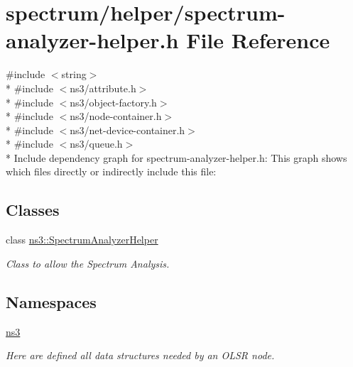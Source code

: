 \hypertarget{spectrum-analyzer-helper_8h}{}\section{spectrum/helper/spectrum-\/analyzer-\/helper.h File Reference}
\label{spectrum-analyzer-helper_8h}
{\ttfamily \#include $<$string$>$}\\*
{\ttfamily \#include $<$ns3/attribute.\+h$>$}\\*
{\ttfamily \#include $<$ns3/object-\/factory.\+h$>$}\\*
{\ttfamily \#include $<$ns3/node-\/container.\+h$>$}\\*
{\ttfamily \#include $<$ns3/net-\/device-\/container.\+h$>$}\\*
{\ttfamily \#include $<$ns3/queue.\+h$>$}\\*
Include dependency graph for spectrum-\/analyzer-\/helper.h\+:
This graph shows which files directly or indirectly include this file\+:
\subsection*{Classes}
\begin{DoxyCompactItemize}
\item 
class \hyperlink{classns3_1_1SpectrumAnalyzerHelper}{ns3\+::\+Spectrum\+Analyzer\+Helper}
\begin{DoxyCompactList}\small\item\em Class to allow the Spectrum Analysis. \end{DoxyCompactList}\end{DoxyCompactItemize}
\subsection*{Namespaces}
\begin{DoxyCompactItemize}
\item 
 \hyperlink{namespacens3}{ns3}
\begin{DoxyCompactList}\small\item\em Here are defined all data structures needed by an O\+L\+SR node. \end{DoxyCompactList}\end{DoxyCompactItemize}
